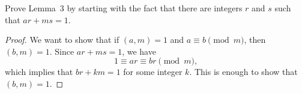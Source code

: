  Prove Lemma~3 by starting with the fact that there are
integers $r$ and $s$ such that $ar + ms = 1$.
\begin{proof}
  We want to show that if $(a,m) = 1$ and $a\equiv b\pmod{m}$, then
  $(b,m) = 1$. Since $ar + ms = 1$, we have
  \begin{equation*}
    1 \equiv ar \equiv br \pmod{m},
  \end{equation*}
  which implies that $br + km = 1$ for some integer $k$. This is
  enough to show that $(b,m) = 1$.
\end{proof}

